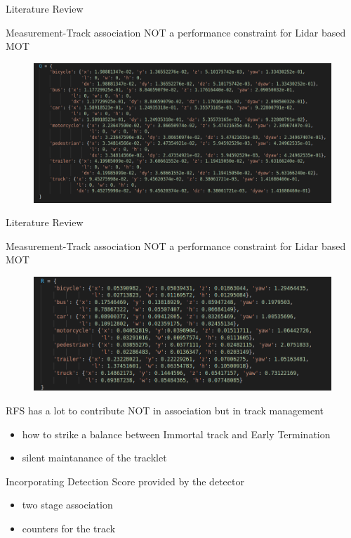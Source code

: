     \begin{frame}{Literature Review}
    \begin{block}{Measurement-Track association NOT a performance constraint for Lidar based MOT}
        \begin{figure}
        \includegraphics[width=0.9\linewidth]{DA/3.png}
        \end{figure}
    \end{block}
    \end{frame}
    
    \begin{frame}{Literature Review}
    \begin{block}{Measurement-Track association NOT a performance constraint for Lidar based MOT}
        \begin{figure}
        \includegraphics[width=0.9\linewidth]{DA/4.png}
        \end{figure}
    \end{block}
    \end{frame}
    
    
    
    \begin{frame}{RFS has a lot to contribute NOT in association but in track management}
        \begin{itemize}
            \item{how to strike a balance between Immortal track and Early Termination}
            \item{silent maintanance of the tracklet}
        \end{itemize}
    \end{frame}
    
    \begin{frame}{Incorporating Detection Score provided by the detector}
        \begin{itemize}
            \item{two stage association}
            \item{counters for the track}
        \end{itemize}
    \end{frame}